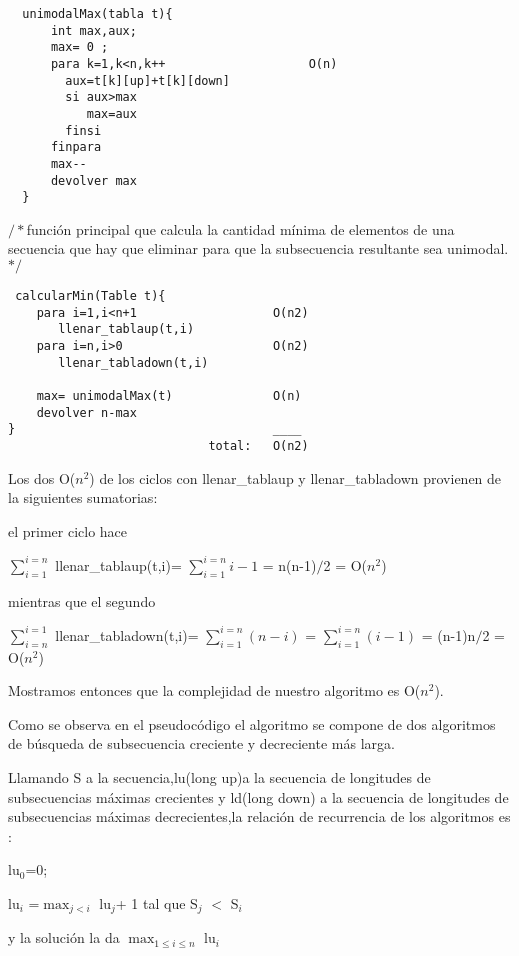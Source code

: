 \begin{verbatim}
  unimodalMax(tabla t){
      int max,aux; 	
      max= 0 ;
      para k=1,k<n,k++                    O(n)
	    aux=t[k][up]+t[k][down]
	    si aux>max 
	       max=aux
	    finsi 
	  finpara
	  max-- 
      devolver max
  }
\end{verbatim}


$/*$función principal que calcula la cantidad mínima de elementos de una secuencia que hay que eliminar para que la subsecuencia resultante sea unimodal.$*/$

\begin{verbatim}
 calcularMin(Table t){
    para i=1,i<n+1                   O(n2)
       llenar_tablaup(t,i) 
    para i=n,i>0                     O(n2)
       llenar_tabladown(t,i)
    
    max= unimodalMax(t)              O(n)
    devolver n-max   
}                                    ____
                            total:   O(n2)
\end{verbatim}                       

Los dos O($n^{2}$) de los ciclos con llenar\_tablaup y llenar\_tabladown provienen de la siguientes sumatorias:

el primer ciclo hace

$\sum_{i=1}^{i=n}$ llenar\_tablaup(t,i)= $\sum_{i=1}^{i=n} i-1 $ = n(n-1)$/$2 = O($n^{2}$)

mientras que el segundo

$\sum_{i=n}^{i=1}$ llenar\_tabladown(t,i)= $\sum_{i=1}^{i=n}(n-i)$ = $\sum_{i=1}^{i=n}(i-1)$ = (n-1)n$/$2 = O($n^{2}$)
                       
Mostramos entonces que la complejidad de nuestro algoritmo es O($n^{2}$).



\newline
Como se observa en el pseudocódigo el algoritmo se compone de dos algoritmos de búsqueda de subsecuencia creciente y decreciente más larga.

Llamando S a la secuencia,lu(long up)a la secuencia de longitudes de subsecuencias máximas crecientes  y ld(long down) a la secuencia de longitudes de subsecuencias máximas decrecientes,la relación de recurrencia de los algoritmos es :

lu$_0$=0;

lu$_i$ =$\max_{j<i}$ lu$_j$+ 1  tal que S$_j$ $<$ S$_i$  

y la solución la da $\max_{1\leq i\leq n}$ lu$_i$

